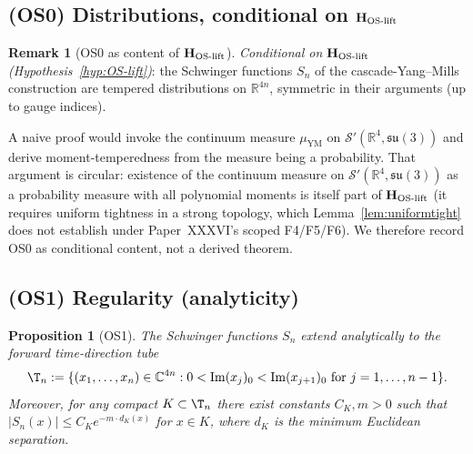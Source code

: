 \documentclass[11pt, a4paper]{amsart}
\newtheorem{proposition}[theorem]{Proposition}
\theoremstyle{definition}
\newtheorem{remark}[theorem]{Remark}
\newcommand{\R}{\mathbb{R}}
\newcommand{\C}{\mathbb{C}}
\begin{document}
\subsection{(OS0) Distributions, conditional on $\mathbf{H_{\rm OS\text{-}lift}}$}

\begin{remark}[OS0 as content of $\mathbf{H_{\rm OS\text{-}lift}}$]\label{prop:OS0}
\emph{Conditional on $\mathbf{H_{\rm OS\text{-}lift}}$
(Hypothesis~\ref{hyp:OS-lift})}: the Schwinger functions $S_n$
of the cascade-Yang--Mills construction are tempered distributions
on $\R^{4n}$, symmetric in their arguments (up to gauge indices).

A naive proof would invoke the continuum measure
$\mu_{\mathrm{YM}}$ on $\mathcal{S}'(\R^4,\mathfrak{su}(3))$ and
derive moment-temperedness from the measure being a probability.
That argument is circular: existence of the continuum measure on
$\mathcal{S}'(\R^4,\mathfrak{su}(3))$ as a probability measure with
all polynomial moments is itself part of
$\mathbf{H_{\rm OS\text{-}lift}}$ (it requires uniform tightness
in a strong topology, which Lemma~\ref{lem:uniformtight} does not
establish under Paper~XXXVI's scoped F4/F5/F6). We therefore record
OS0 as conditional content, not a derived theorem.
\end{remark}

\subsection{(OS1) Regularity (analyticity)}

\begin{proposition}[OS1]\label{prop:OS1}
The Schwinger functions $S_n$ extend analytically to the forward
time-direction tube
\[
\T_n := \{(x_1, \dots, x_n) \in \C^{4n} : 0 < \mathrm{Im}(x_j)_0 < \mathrm{Im}(x_{j+1})_0 \text{ for } j=1,\dots,n-1\}.
\]
Moreover, for any compact $K \subset \T_n$ there exist constants
$C_K, m > 0$ such that $|S_n(x)| \leq C_K e^{-m \cdot d_K(x)}$
for $x \in K$, where $d_K$ is the minimum Euclidean separation.
\end{proposition}
\end{document}
